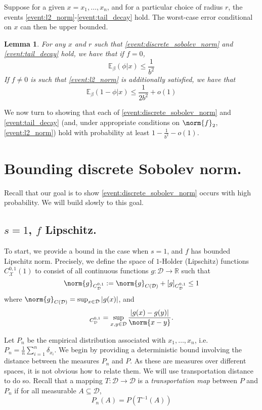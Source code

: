 \documentclass{article}
\newcommand{\Reals}{\mathbb{R}}
\newcommand{\abs}[1]{\left \lvert #1 \right \rvert}
\newcommand{\1}{\mathbb{I}}
\newcommand{\D}{\mathcal{D}}
\newcommand{\Ebb}{\mathbb{E}}
\theoremstyle{alden}
\theoremstyle{aldenthm}
\newtheorem{lemma}{Lemma}
\theoremstyle{definition}
\theoremstyle{remark}
\begin{document}
Suppose for a given $x = x_1, \ldots, x_n$, and for a particular choice of radius $r$, the events \ref{event:l2_norm}-\ref{event:tail_decay} hold. The worst-case error conditional on $x$ can then be upper bounded.
\begin{lemma}
	\label{lem:discrete_test_error}
	For any $x$ and $r$ such that \ref{event:discrete_sobolev_norm} and \ref{event:tail_decay} hold, we have that if $f = 0$,
	\begin{equation*}
	\Ebb_{\beta}(\phi|x) \leq \frac{1}{b^2}
	\end{equation*}
	If $f \neq 0$ is such that \ref{event:l2_norm} is additionally satisfied, we have that
	\begin{equation*}
	\Ebb_{\beta}(1 -\phi|x) \leq \frac{1}{2b^2} + o(1)
	\end{equation*}
\end{lemma}

We now turn to showing that each of \ref{event:discrete_sobolev_norm} and \ref{event:tail_decay} (and, under appropriate conditions on $\norm{f}_2$, \ref{event:l2_norm}) hold with probability at least $1 - \frac{1}{b^2} - o(1)$. 

\section{Bounding discrete Sobolev norm.}
Recall that our goal is to show \ref{event:discrete_sobolev_norm} occurs with high probability. We will build slowly to this goal.

\subsection{$s = 1$, $f$ Lipschitz.}
To start, we provide a bound in the case when $s = 1$, and $f$ has bounded Lipschitz norm. Precisely, we define the space of $1$-Holder (Lipschitz) functions $C_{\mathcal{X}}^{0,1}(1)$ to consist of all continuous functions $g: \D \to \Reals$ such that
\begin{equation*}
\norm{g}_{C_{\D}^{0,1}} := \norm{g}_{C(\D)} + [g]_{C_{\D}^{0,1}} \leq 1
\end{equation*}
where $\norm{g}_{C(\D)} = \sup_{x \in \D} \abs{g(x)}$, and
\begin{equation*}
[g]_{C_{\D}^{0,1}} = \sup_{x,y \in \D} \frac{\abs{g(x) - g(y)}}{\norm{x - y}}.
\end{equation*}

Let $P_n$ be the empirical distribution associated with $x_1,\ldots,x_n$, i.e. $P_n = \frac{1}{n}\sum_{i = 1}^{n} \delta_{x_i}$. We begin by providing a deterministic bound involving the distance between the measures $P_n$ and $P$. As these are measures over different spaces, it is not obvious how to relate them. We will use transportation distance to do so. Recall that a mapping $T: \D \to \D$ is a \emph{transportation map} between $P$ and $P_n$ if for all measurable $A \subseteq \D$,
\begin{equation*}
P_n(A) = P(T^{-1}(A))
\end{equation*}
\end{document}
